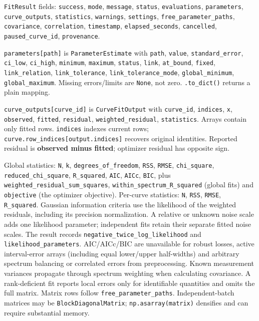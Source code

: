 \documentclass[
  10pt,
  a4paper,
  oneside]{scrreprt}
\begin{document}
\texttt{FitResult} fields: \texttt{success}, \texttt{mode},
\texttt{message}, \texttt{status}, \texttt{evaluations},
\texttt{parameters}, \texttt{curve\_outputs}, \texttt{statistics},
\texttt{warnings}, \texttt{settings}, \texttt{free\_parameter\_paths},
\texttt{covariance}, \texttt{correlation}, \texttt{timestamp},
\texttt{elapsed\_seconds}, \texttt{cancelled},
\texttt{paused\_curve\_id}, \texttt{provenance}.

\texttt{parameters{[}path{]}} is \texttt{ParameterEstimate} with
\texttt{path}, \texttt{value}, \texttt{standard\_error},
\texttt{ci\_low}, \texttt{ci\_high}, \texttt{minimum}, \texttt{maximum},
\texttt{status}, \texttt{link}, \texttt{at\_bound}, \texttt{fixed},
\texttt{link\_relation}, \texttt{link\_tolerance},
\texttt{link\_tolerance\_mode}, \texttt{global\_minimum},
\texttt{global\_maximum}. Missing errors/limits are \texttt{None}, not
zero. \texttt{.to\_dict()} returns a plain mapping.

\texttt{curve\_outputs{[}curve\_id{]}} is \texttt{CurveFitOutput} with
\texttt{curve\_id}, \texttt{indices}, \texttt{x}, \texttt{observed},
\texttt{fitted}, \texttt{residual}, \texttt{weighted\_residual},
\texttt{statistics}. Arrays contain only fitted rows. \texttt{indices}
indexes current rows; \texttt{curve.row\_indices{[}output.indices{]}}
recovers original identities. Reported residual is \textbf{observed
minus fitted}; optimizer residual has opposite sign.

Global statistics: \texttt{N}, \texttt{k},
\texttt{degrees\_of\_freedom}, \texttt{RSS}, \texttt{RMSE},
\texttt{chi\_square}, \texttt{reduced\_chi\_square},
\texttt{R\_squared}, \texttt{AIC}, \texttt{AICc}, \texttt{BIC}, plus
\texttt{weighted\_residual\_sum\_squares},
\texttt{within\_spectrum\_R\_squared} (global fits) and
\texttt{objective} (the optimizer objective). Per-curve statistics:
\texttt{N}, \texttt{RSS}, \texttt{RMSE}, \texttt{R\_squared}. Gaussian
information criteria use the likelihood of the weighted residuals,
including its precision normalization. A relative or unknown noise scale
adds one likelihood parameter; independent fits retain their separate
fitted noise scales. The result records
\texttt{negative\_twice\_log\_likelihood} and
\texttt{likelihood\_parameters}. AIC/AICc/BIC are unavailable for robust
losses, active interval-error arrays (including equal lower/upper
half-widths) and arbitrary spectrum balancing or correlated errors from
preprocessing. Known measurement variances propagate through spectrum
weighting when calculating covariance. A rank-deficient fit reports
local errors only for identifiable quantities and omits the full matrix.
Matrix rows follow \texttt{free\_parameter\_paths}. Independent-batch
matrices may be \texttt{BlockDiagonalMatrix};
\texttt{np.asarray(matrix)} densifies and can require substantial
memory.
\end{document}
